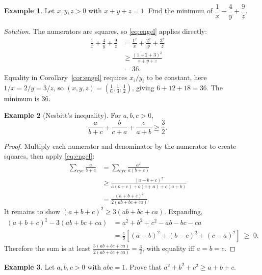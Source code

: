 \documentclass[11pt,a4paper]{article}
\theoremstyle{definition}
\newtheorem{example}{Example}[section]
\theoremstyle{remark}
\begin{document}
\begin{example}\label{ex:149}
Let $x, y, z > 0$ with $x + y + z = 1$. Find the minimum of $\dfrac{1}{x} + \dfrac{4}{y} + \dfrac{9}{z}$.
\end{example}

\noindent\textit{Solution.} The numerators are squares, so \eqref{eq:engel} applies directly:
\begin{align*}
  \frac{1}{x} + \frac{4}{y} + \frac{9}{z}
    &= \frac{1^2}{x} + \frac{2^2}{y} + \frac{3^2}{z} \\
    &\geq \frac{(1 + 2 + 3)^2}{x + y + z} \\
    &= 36.
\end{align*}
Equality in Corollary~\ref{cor:engel} requires $x_i / y_i$ to be constant, here $1/x = 2/y = 3/z$, so $(x, y, z) = (\tfrac16, \tfrac13, \tfrac12)$, giving $6 + 12 + 18 = 36$. The minimum is $36$.

\begin{example}[Nesbitt's inequality]\label{ex:nesbitt}
For $a, b, c > 0$,
\[
  \frac{a}{b + c} + \frac{b}{c + a} + \frac{c}{a + b} \geq \frac{3}{2}.
\]
\end{example}

\begin{proof}
Multiply each numerator and denominator by the numerator to create squares, then apply \eqref{eq:engel}:
\begin{align*}
  \sum_{\text{cyc}} \frac{a}{b + c}
    &= \sum_{\text{cyc}} \frac{a^2}{a(b + c)} \\
    &\geq \frac{(a + b + c)^2}{a(b + c) + b(c + a) + c(a + b)} \\
    &= \frac{(a + b + c)^2}{2(ab + bc + ca)}.
\end{align*}
It remains to show $(a + b + c)^2 \geq 3(ab + bc + ca)$. Expanding,
\begin{align*}
  (a + b + c)^2 - 3(ab + bc + ca)
    &= a^2 + b^2 + c^2 - ab - bc - ca \\
    &= \tfrac{1}{2}\left[(a - b)^2 + (b - c)^2 + (c - a)^2\right] \;\geq\; 0. \tag{$\ast$}\label{eq:sos}
\end{align*}
Therefore the sum is at least $\frac{3(ab + bc + ca)}{2(ab + bc + ca)} = \frac{3}{2}$, with equality iff $a = b = c$.
\end{proof}

\begin{example}\label{ex:abc1}
Let $a, b, c > 0$ with $abc = 1$. Prove that $a^2 + b^2 + c^2 \geq a + b + c$.
\end{example}
\end{document}
